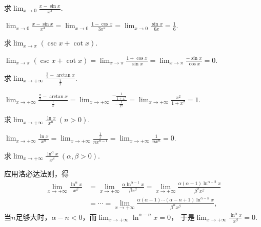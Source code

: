 \begin{example}
求\(\lim_{x\to0} \frac{x-\sin x}{x^3}\).
\begin{solution}
\(\lim_{x\to0} \frac{x-\sin x}{x^3}
= \lim_{x\to0} \frac{1-\cos x}{3x^2}
= \lim_{x\to0} \frac{\sin x}{6x}
= \frac16\).
\end{solution}
\end{example}

\begin{example}
求\(\lim_{x\to\pi} (\csc x+\cot x)\).
\begin{solution}
\(\lim_{x\to\pi} (\csc x+\cot x)
= \lim_{x\to\pi} \frac{1+\cos x}{\sin x}
= \lim_{x\to\pi} \frac{-\sin x}{\cos x}
= 0\).
\end{solution}
\end{example}

\begin{example}
求\(\lim_{x\to+\infty} \frac{\frac{\pi}{2} - \arctan x}{\frac{1}{x}}\).
\begin{solution}
\(\lim_{x\to+\infty} \frac{\frac{\pi}{2} - \arctan x}{\frac{1}{x}}
= \lim_{x\to+\infty} \frac{-\frac{1}{1+x^2}}{-\frac{1}{x^2}}
= \lim_{x\to+\infty} \frac{x^2}{1+x^2} = 1\).
\end{solution}
\end{example}

\begin{example}\label{example:微分中值定理.洛必达法则.无穷大比无穷大型1}
求\(\lim_{x\to+\infty} \frac{\ln x}{x^n}\ (n>0)\).
\begin{solution}
\(\lim_{x\to+\infty} \frac{\ln x}{x^n}
= \lim_{x\to+\infty} \frac{\frac{1}{x}}{n x^{n-1}} %
= \lim_{x\to+\infty} \frac{1}{n x^n} = 0\).
\end{solution}
\end{example}
\begin{example}
求\(\lim_{x\to+\infty} \frac{\ln^\alpha x}{x^\beta}\ (\alpha,\beta>0)\).
\begin{solution}
应用洛必达法则，得\begin{align*}
	\lim_{x\to+\infty} \frac{\ln^\alpha x}{x^\beta}
	&= \lim_{x\to+\infty} \frac{\alpha \ln^{\alpha-1} x}{\beta x^\beta}
	= \lim_{x\to+\infty} \frac{\alpha(\alpha-1) \ln^{\alpha-2} x}{\beta^2 x^\beta} \\
	&= \dotsb
	= \lim_{x\to+\infty} \frac{\alpha(\alpha-1)\dotsm(\alpha-n+1) \ln^{\alpha-n} x}{\beta^n x^\beta},
\end{align*}
当\(n\)足够大时，\(\alpha-n<0\)，而\(\lim_{x\to+\infty} \ln^{\alpha-n} x = 0\)，
于是\(\lim_{x\to+\infty} \frac{\ln^\alpha x}{x^\beta} = 0\).
\end{solution}
\end{example}

